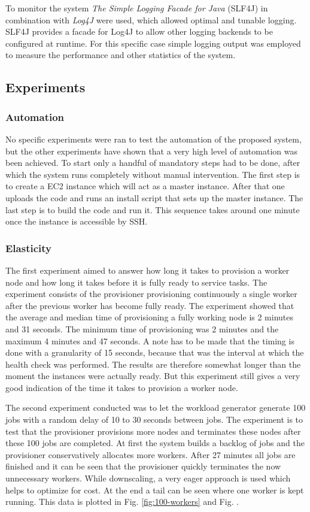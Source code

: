 \documentclass[a4paper]{IEEEtran}
\begin{document}
To monitor the system \emph{The Simple Logging Facade for Java} (SLF4J) in combination with \emph{Log4J} were used, which allowed optimal and tunable logging.
SLF4J provides a facade for Log4J to allow other logging backends to be configured at runtime.
For this specific case simple logging output was employed to measure the performance and other statistics of the system.

\subsection{Experiments}

\subsubsection{Automation}
No specific experiments were ran to test the automation of the proposed system, but the other experiments have shown that a very high level of automation was been achieved.
To start only a handful of mandatory steps had to be done, after which the system runs completely without manual intervention.
The first step is to create a EC2 instance which will act as a master instance.
After that one uploads the code and runs an install script that sets up the master instance.
The last step is to build the code and run it.
This sequence takes around one minute once the instance is accessible by SSH.

\subsubsection{Elasticity}

The first experiment aimed to answer how long it takes to provision a worker node and how long it takes before it is fully ready to service tasks.
The experiment consists of the provisioner provisioning continuously a single worker after the previous worker has become fully ready.
The experiment showed that the average and median time of provisioning a fully working node is 2 minutes and 31 seconds.
The minimum time of provisioning was 2 minutes and the maximum 4 minutes and 47 seconds.
A note has to be made that the timing is done with a granularity of 15 seconds, because that was the interval at which the health check was performed.
The results are therefore somewhat longer than the moment the instances were actually ready.
But this experiment still gives a very good indication of the time it takes to provision a worker node.

The second experiment conducted was to let the workload generator generate 100 jobs with a random delay of 10 to 30 seconds between jobs.
The experiment is to test that the provisioner provisions more nodes and terminates these nodes after these 100 jobs are completed.
At first the system builds a backlog of jobs and the provisioner conservatively allocates more workers.
After 27 minutes all jobs are finished and it can be seen that the provisioner quickly terminates the now unnecessary workers.
While downscaling, a very eager approach is used which helps to optimize for cost.
At the end a tail can be seen where one worker is kept running.
This data is plotted in Fig. \ref{fig:100-workers} and Fig. .
\end{document}
